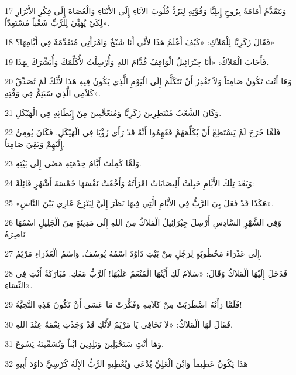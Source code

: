 \par 17 وَيَتَقَدَّمُ أَمَامَهُ بِرُوحِ إِيلِيَّا وَقُوَّتِهِ لِيَرُدَّ قُلُوبَ الآبَاءِ إِلَى الأَبْنَاءِ وَالْعُصَاةَ إِلَى فِكْرِ الأَبْرَارِ لِكَيْ يُهَيِّئَ لِلرَّبِّ شَعْباً مُسْتَعِدّاً».
\par 18 فَقَالَ زَكَرِيَّا لِلْمَلاَكِ: «كَيْفَ أَعْلَمُ هَذَا لأَنِّي أَنَا شَيْخٌ وَامْرَأَتِي مُتَقَدِّمَةٌ فِي أَيَّامِهَا؟»
\par 19 فَأَجَابَ الْمَلاَكُ: «أَنَا جِبْرَائِيلُ الْوَاقِفُ قُدَّامَ اللهِ وَأُرْسِلْتُ لأُكَلِّمَكَ وَأُبَشِّرَكَ بِهَذَا.
\par 20 وَهَا أَنْتَ تَكُونُ صَامِتاً وَلاَ تَقْدِرُ أَنْ تَتَكَلَّمَ إِلَى الْيَوْمِ الَّذِي يَكُونُ فِيهِ هَذَا لأَنَّكَ لَمْ تُصَدِّقْ كَلاَمِي الَّذِي سَيَتِمُّ فِي وَقْتِهِ».
\par 21 وَكَانَ الشَّعْبُ مُنْتَظِرِينَ زَكَرِيَّا وَمُتَعّجِّبِينَ مِنْ إِبْطَائِهِ فِي الْهَيْكَلِ.
\par 22 فَلَمَّا خَرَجَ لَمْ يَسْتَطِعْ أَنْ يُكَلِّمَهُمْ فَفَهِمُوا أَنَّهُ قَدْ رَأَى رُؤْيَا فِي الْهَيْكَلِ. فَكَانَ يُومِئُ إِلَيْهِمْ وَبَقِيَ صَامِتاً.
\par 23 وَلَمَّا كَمِلَتْ أَيَّامُ خِدْمَتِهِ مَضَى إِلَى بَيْتِهِ.
\par 24 وَبَعْدَ تِلْكَ الأَيَّامِ حَبِلَتْ أَلِيصَابَاتُ امْرَأَتُهُ وَأَخْفَتْ نَفْسَهَا خَمْسَةَ أَشْهُرٍ قَائِلَةً:
\par 25 «هَكَذَا قَدْ فَعَلَ بِيَ الرَّبُّ فِي الأَيَّامِ الَّتِي فِيهَا نَظَرَ إِلَيَّ لِيَنْزِعَ عَارِي بَيْنَ النَّاسِ».
\par 26 وَفِي الشَّهْرِ السَّادِسِ أُرْسِلَ جِبْرَائِيلُ الْمَلاَكُ مِنَ اللهِ إِلَى مَدِينَةٍ مِنَ الْجَلِيلِ اسْمُهَا نَاصِرَةُ
\par 27 إِلَى عَذْرَاءَ مَخْطُوبَةٍ لِرَجُلٍ مِنْ بَيْتِ دَاوُدَ اسْمُهُ يُوسُفُ. وَاسْمُ الْعَذْرَاءِ مَرْيَمُ.
\par 28 فَدَخَلَ إِلَيْهَا الْمَلاَكُ وَقَالَ: «سَلاَمٌ لَكِ أَيَّتُهَا الْمُنْعَمُ عَلَيْهَا! اَلرَّبُّ مَعَكِ. مُبَارَكَةٌ أَنْتِ فِي النِّسَاءِ».
\par 29 فَلَمَّا رَأَتْهُ اضْطَرَبَتْ مِنْ كَلاَمِهِ وَفَكَّرَتْ مَا عَسَى أَنْ تَكُونَ هَذِهِ التَّحِيَّةُ!
\par 30 فَقَالَ لَهَا الْمَلاَكُ: «لاَ تَخَافِي يَا مَرْيَمُ لأَنَّكِ قَدْ وَجَدْتِ نِعْمَةً عِنْدَ اللهِ.
\par 31 وَهَا أَنْتِ سَتَحْبَلِينَ وَتَلِدِينَ ابْناً وَتُسَمِّينَهُ يَسُوعَ.
\par 32 هَذَا يَكُونُ عَظِيماً وَابْنَ الْعَلِيِّ يُدْعَى وَيُعْطِيهِ الرَّبُّ الإِلَهُ كُرْسِيَّ دَاوُدَ أَبِيهِ
